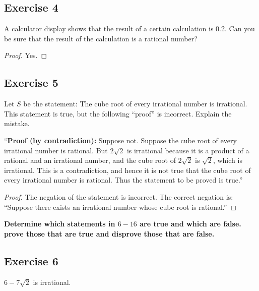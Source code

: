 \documentclass[14pt]{extarticle}
\newcommand{\cy}{\color{cyan}}
\begin{document}
\subsection{Exercise 4}
A calculator display shows that the result of a certain calculation is 0.2. Can you be sure that the result of the calculation is a rational number?

\begin{proof}
Yes.
\end{proof}

\subsection{Exercise 5}
Let $S$ be the statement: The cube root of every irrational number is irrational. This statement is true, but the following “proof” is incorrect. Explain the mistake.

“{\bf Proof (by contradiction):} Suppose not. Suppose the cube root of every irrational number is rational. But $2\sqrt{2}$ is irrational because it is a product of a rational and an irrational number, and the cube root of $2\sqrt{2}$ is $\sqrt{2}$, which is irrational. This is a contradiction, and hence it is not true that the cube root of every irrational number is rational. Thus the statement to be proved is true.”

\begin{proof}
The negation of the statement is incorrect. The correct negation is: ``Suppose there exists an irrational number whose cube root is rational.''
\end{proof}

{\bf \cy Determine which statements in $6-16$ are true and which are false. prove those that are true and disprove those that are false.}

\subsection{Exercise 6}
$6 - 7\sqrt{2}$ is irrational.
\end{document}

